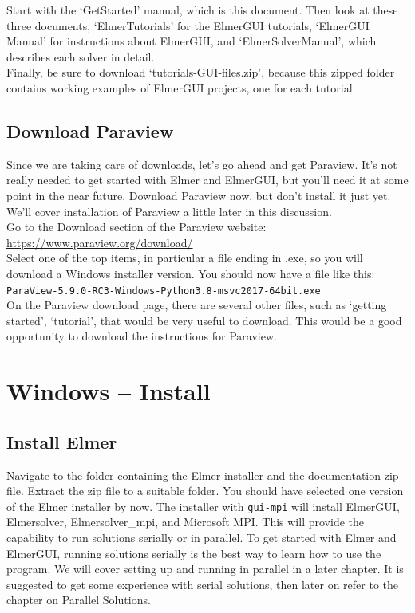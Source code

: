 Start with the `GetStarted' manual, which is this document.  Then look at these three documents, `ElmerTutorials' for the ElmerGUI tutorials, `ElmerGUI Manual' for instructions about ElmerGUI, and `ElmerSolverManual', which describes each solver in detail.  \\

Finally, be sure to download `tutorials-GUI-files.zip', because this zipped folder contains working examples of ElmerGUI projects, one for each tutorial.

\section{Download Paraview}

Since we are taking care of downloads, let's go ahead and get Paraview.  It's not really needed to get started with Elmer and ElmerGUI, but you'll need it at some point in the near future.  Download Paraview now, but don't install it just yet.  We'll cover installation of Paraview a little later in this discussion.\\

Go to the Download section of the Paraview website:\\

 \url{https://www.paraview.org/download/}\\

Select one of the top items, in particular a file ending in .exe, so you will download a Windows installer version.  You should now have a file like this:\\

\texttt{ParaView-5.9.0-RC3-Windows-Python3.8-msvc2017-64bit.exe}\\

On the Paraview download page, there are several other files, such as `getting started', `tutorial', that would be very useful to download.  This would be a good opportunity to download the instructions for Paraview.



\chapter{Windows -- Install}

\section{Install Elmer}

Navigate to the folder containing the Elmer installer and the documentation zip file.  Extract the zip file to a suitable folder.  You should have selected one version of the Elmer installer by now.  The installer with \texttt{gui-mpi} will install ElmerGUI, Elmersolver, Elmersolver\_mpi, and Microsoft MPI.  This will provide the capability to run solutions serially or in parallel.  To get started with Elmer and ElmerGUI, running solutions serially is the best way to learn how to use the program.  We will cover setting up and running in parallel in a later chapter.  It is suggested to get some experience with serial solutions, then later on refer to the chapter on Parallel Solutions.\\

